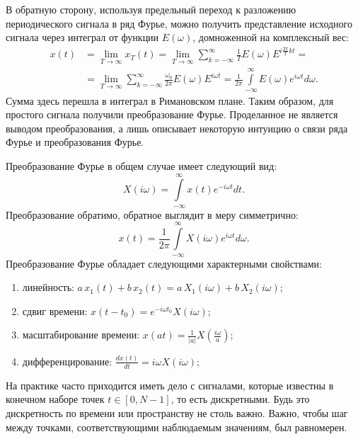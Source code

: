 В обратную сторону, используя предельный переход к разложению периодического сигнала в ряд Фурье, можно получить представление исходного сигнала через интеграл от функции $E(\omega)$, домноженной на комплексный вес:
\begin{align*} 
x(t) & = \lim \limits _{T \to \infty} x_T(t) = \lim \limits _{T \to \infty} \sum \limits_{k=-\infty}^{\infty} \frac{1}{T} E(\omega) E^{i \frac{2 \pi}{T}kt} = \\
& =  \lim \limits _{T \to \infty} \sum \limits_{k=-\infty}^{\infty} \frac{\omega_0}{2 \pi} E(\omega) E^{i \omega t} = \frac{1}{2 \pi} \int \limits_{-\infty}^{\infty} E(\omega) e^{i \omega t} d \omega.
\end{align*}
Сумма здесь перешла в интеграл в Римановском плане. Таким образом, для простого сигнала получили преобразование Фурье. Проделанное не является выводом преобразования, а лишь описывает некоторую интуицию о связи ряда Фурье и преобразования Фурье.

Преобразование Фурье в общем случае имеет следующий вид:
$$X(i \omega) = \int \limits_{-\infty}^{\infty} x(t) e^{-i\omega t} dt.$$
Преобразование обратимо, обратное выглядит в меру симметрично:
$$x(t) = \frac{1}{2\pi} \int \limits_{-\infty}^{\infty} X(i \omega) e^{i \omega t} d\omega.$$
Преобразование Фурье обладает следующими характерными свойствами:
\begin{enumerate}
\item линейность: $a \, x_1(t) + b \, x_2(t) = a\,X_1(i \omega) + b\,X_2(i \omega)$;
\item сдвиг времени: $x(t - t_0) = e^{- i \omega t_0} X(i \omega)$;
\item масштабирование времени: $x(at) = \frac{1}{|a|}X(\frac{i \omega}{a})$;
\item дифференцирование: $\frac{dx(t)}{dt} = i \omega X(i \omega)$;
\end{enumerate}

На практике часто приходится иметь дело с сигналами, которые известны в конечном наборе точек $t \in [0, N-1]$, то есть дискретными. Будь это дискретность по времени или пространству не столь важно. Важно, чтобы шаг между точками, соответствующими наблюдаемым значениям, был равномерен.

